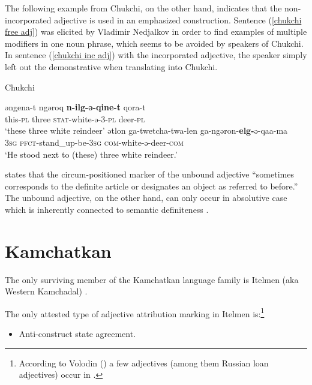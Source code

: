 The following example from Chukchi, on the other hand, indicates that the non-incorporated adjective is used in an emphasized construction. Sentence (\ref{chukchi free adj}) was elicited by Vladimir Nedjalkov \citep[cited as pc in][330]{rijkhoff2002} in order to find examples of multiple modifiers in one noun phrase, which seems to be avoided by speakers of Chukchi. In sentence (\ref{chukchi inc adj}) with the incorporated adjective, the speaker simply left out the demonstrative when translating into Chukchi.
\begin{exe}
\ex \rm{Chukchi \citep[Vladimir Nedjalkov, pc, cit.][330]{rijkhoff2002}}
\begin{xlist}
\ex \label{chukchi free adj}
\gll	əngena-t ngəroq \textbf{n-ilg-ə-qine-t} qora-t\\
	this-\textsc{pl} three \textsc{stat}-white-ə-3-\textsc{pl} deer-\textsc{pl}\\
\glt	‘these three white reindeer’
\ex \label{chukchi inc adj}
\gll	ətlon ga-twetcha-twa-len ga-ngəron-\textbf{elg-}ə-qaa-ma\\
	\textsc{3sg} \textsc{pfct}-stand\_up-be-\textsc{3sg} \textsc{com}-white-ə-deer-\textsc{com}\\
\glt	‘He stood next to (these) three white reindeer.’
\end{xlist}
\end{exe}
\citet[716]{bogoras1922} states that the circum-positioned marker of the unbound adjective “sometimes corresponds to the definite article or designates an object as referred to before.” The unbound adjective, on the other hand, can only occur in absolutive case which is inherently connected to semantic definiteness \citep[cf.][207, passim]{dunn1999}.

\section{Kamchatkan}
The only surviving member of the Kamchatkan language family is Itelmen (aka Western Kamchadal) \citep[224]{salminen2007}.

The only attested type of adjective attribution marking in Itelmen is:\footnote{According to Volodin (\citeyear{volodin1997}) a few adjectives (among them Russian loan adjectives) occur in .}
\begin{itemize}
\item Anti\hyp{}construct state agreement.
\end{itemize}

